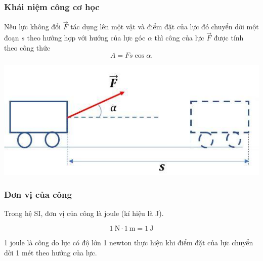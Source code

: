 	
	\subsubsection{Khái niệm công cơ học}
	Nếu lực không đổi $\vec{F}$ tác dụng lên một vật và điểm đặt của lực đó chuyển dời một đoạn $s$ theo hướng hợp với hướng của lực góc $\alpha$ thì công của lực $\vec{F}$ được tính theo công thức
	\begin{equation*}
		A=Fs\cos \alpha.
	\end{equation*}
	\begin{center}
		\includegraphics[scale=0.6]{../figs/VN10-PH-30-L-022-1-3.jpg}
	\end{center}
	\subsubsection{Đơn vị của công}
	Trong hệ SI, đơn vị của công là joule (kí hiệu là J).
	
	$$1\ \text{N} \cdot 1\ \text{m}= 1\ \text{J}$$
	
	1 joule là công do lực có độ lớn 1 newton thực hiện khi điểm đặt của lực chuyển dời 1 mét theo hướng của lực.
